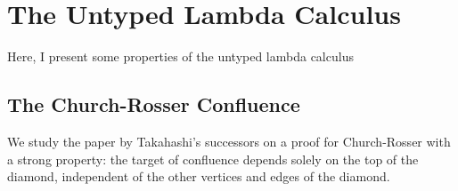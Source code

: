 \chapter{The Untyped Lambda Calculus}

Here, I present some properties of the untyped lambda calculus

\section{The Church-Rosser Confluence}
We study the paper by Takahashi's successors on a proof for Church-Rosser with
a strong property: the target of confluence depends solely on the top of the diamond,
independent of the other vertices and edges of the diamond.
